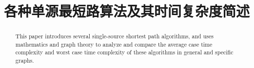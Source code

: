 \documentclass[conference]{IEEEtran}
\begin{document}
\title{各种单源最短路算法及其时间复杂度简述}


\author{
}

\maketitle

\begin{abstract}
    This paper introduces several single-source shortest path algorithms, and uses mathematics and graph theory to analyze and compare the average case time complexity and worst case time complexity of these algorithms in general and specific graphs.
\end{abstract}


%
\IEEEpeerreviewmaketitle



\end{document}
